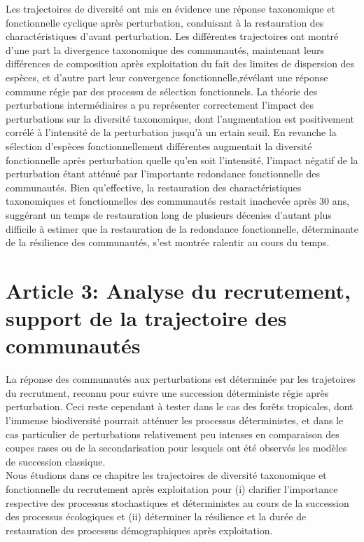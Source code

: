 \documentclass[
  11pt,
  french,
  A4paper,
  extrafontsizes,onecolumn,openright
  ]{memoir}
\begin{document}
Les trajectoires de diversité ont mis en évidence une réponse
taxonomique et fonctionnelle cyclique après perturbation, conduisant à
la restauration des charactéristiques d'avant perturbation. Les
différentes trajectoires ont montré d'une part la divergence taxonomique
des communautés, maintenant leurs différences de composition après
exploitation du fait des limites de dispersion des espèces, et d'autre
part leur convergence fonctionnelle,révélant une réponse commune régie
par des processu de sélection fonctionnels. La théorie des perturbations
intermédiaires a pu représenter correctement l'impact des perturbations
sur la diversité taxonomique, dont l'augmentation est positivement
corrélé à l'intensité de la perturbation jusqu'à un ertain seuil. En
revanche la sélection d'espèces fonctionnellement différentes augmentait
la diversité fonctionnelle après perturbation quelle qu'en soit
l'intensité, l'impact négatif de la perturbation étant atténué par
l'importante redondance fonctionnelle des communautés. Bien
qu'effective, la restauration des charactéristiques taxonomiques et
fonctionnelles des communautés restait inachevée après 30 ans, suggérant
un temps de restauration long de plusieurs décenies d'autant plus
difficile à estimer que la restauration de la redondance fonctionnelle,
déterminante de la résilience des communautés, s'est montrée ralentir au
cours du temps.

\chapter{Article 3: Analyse du recrutement, support de la trajectoire
des
communautés}\label{article-3-analyse-du-recrutement-support-de-la-trajectoire-des-communautes}

La réponse des communautés aux perturbations est déterminée par les
trajetoires du recrutment, reconnu pour suivre une succession
déterministe régie après perturbation. Ceci reste cependant à tester
dans le cas des forêts tropicales, dont l'immense biodiversité pourrait
atténuer les processus déterministes, et dans le cas particulier de
perturbations relativement peu intenses en comparaison des coupes rases
ou de la secondarisation pour lesquels ont été observés les modèles de
succession classique.\\
Nous étudions dans ce chapitre les trajectoires de diversité taxonomique
et fonctionnelle du recrutement après exploitation pour (i) clarifier
l'importance respective des processus stochastiques et déterministes au
cours de la succession des processus écologiques et (ii) déterminer la
résilience et la durée de restauration des processus démographiques
après exploitation.
\end{document}
